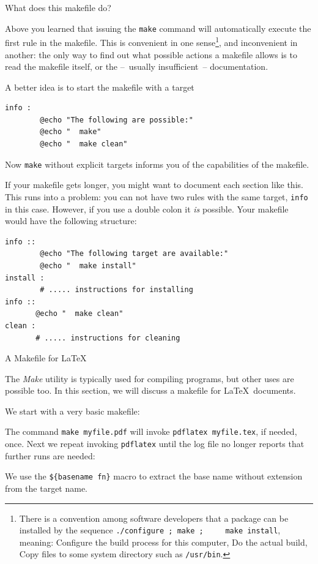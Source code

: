  {What does this makefile do?}

Above you learned that issuing the \lstinline{make} command will automatically
execute the first rule in the makefile. This is convenient in one
sense\footnote {There is a convention among software developers that a
  package can be installed by the sequence \lstinline{./configure ; make ;
    make install}, meaning: Configure the build process for this
  computer, Do the actual build, Copy files to some system directory
  such as \lstinline{/usr/bin}.}, and inconvenient in another: the only way to
find out what possible actions a makefile allows is to read the
makefile itself, or the --~usually insufficient~-- documentation.

A better idea is to start the makefile with a target
\begin{lstlisting}
info :
        @echo "The following are possible:"
        @echo "  make"
        @echo "  make clean"
\end{lstlisting}
Now \lstinline{make} without explicit targets informs you of the capabilities
of the makefile.

If your makefile gets longer, you might want to document each section
like this. This runs into a problem: you can not have two rules with the same
target, \lstinline{info} in this case. However, if you use a double colon
it \emph{is} possible. Your makefile would have the following structure:
\begin{lstlisting}
info ::
        @echo "The following target are available:"
        @echo "  make install"
install :
        # ..... instructions for installing
info ::
       @echo "  make clean"
clean :
       # ..... instructions for cleaning
\end{lstlisting}

 {A Makefile for \LaTeX}
\label{sec:latex-make}

The \emph{Make} utility is typically used for compiling programs, but
other uses are possible too. In this section, we will discuss a
makefile for \LaTeX\ documents.

We start with a very basic makefile:

The command \lstinline{make myfile.pdf} will invoke \lstinline{pdflatex myfile.tex},
if needed, once. Next we repeat invoking \lstinline{pdflatex} until the log file no
longer reports that further runs are needed:

We use the \verb+${basename fn}+ macro to extract the base name
without extension from the target name.

